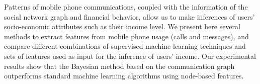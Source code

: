 Patterns of mobile phone communications, coupled with the information of the social network graph and financial behavior, allow us to make inferences of users' socio-economic attributes such as their income level. We present here several methods to extract features from mobile phone usage (calls and messages), and compare different combinations of supervised machine learning techniques and sets of features used as input for the inference of users' income. Our experimental results show that the Bayesian method based on the communication graph outperforms standard machine learning algorithms using node-based features.
